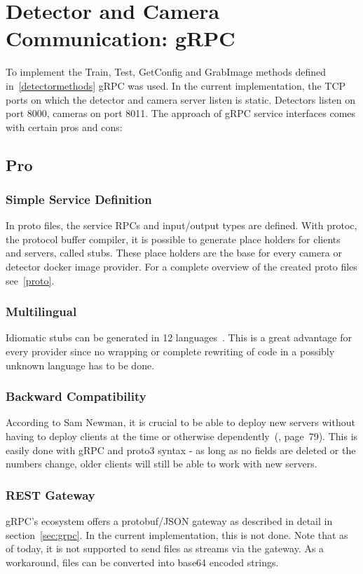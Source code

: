 \section{Detector and Camera Communication: gRPC}
To implement the Train, Test, GetConfig and GrabImage methods defined in~\ref{detectormethods} gRPC was used. In the current implementation, the TCP ports on which the detector and camera server listen is static. Detectors listen on port 8000, cameras on port 8011. The approach of gRPC service interfaces comes with certain pros and cons:
\subsection{Pro}
\subsubsection{Simple Service Definition}
In proto files, the service RPCs and input/output types are defined. With protoc, the protocol buffer compiler, it is possible to generate place holders for clients and servers, called stubs. These place holders are the base for every camera or detector docker image provider. For a complete overview of the created proto files see~\ref{proto}. 
\subsubsection{Multilingual}
Idiomatic stubs can be generated in 12 languages~\cite{gRPC-Documentation2019Last2019}. This is a great advantage for every provider since no wrapping or complete rewriting of code in a possibly unknown language has to be done.
\subsubsection{Backward Compatibility}
According to Sam Newman, it is crucial to be able to deploy new servers without having to deploy clients at the time or otherwise dependently~(\cite{Newman2015BuildingMicroservices}, page~79). This is easily done with gRPC and proto3 syntax - as long as no fields are deleted or the numbers change, older clients will still be able to work with new servers.
\subsubsection{REST Gateway}
gRPC's ecosystem offers a protobuf/JSON gateway as described in detail in section~\ref{sec:grpc}. In the current implementation, this is not done. Note that as of today, it is not supported to send files as streams via the gateway. As a workaround, files can be converted into base64 encoded strings. 
